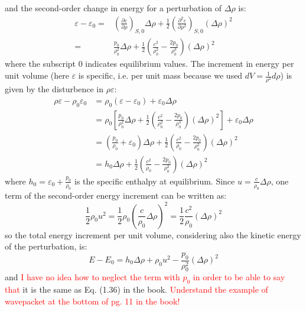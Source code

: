 ﻿\documentclass[11pt]{article}
\begin{document}
\begin{enumerate}
and the second-order change in energy for a perturbation of $\Delta \rho$ is:
  \begin{align}
    \varepsilon - \varepsilon_0 = &\left( \frac{\partial \varepsilon}{\partial \rho} \right)_{S,0} \Delta \rho + \frac{1}{2} \left( \frac{\partial^2 \varepsilon}{\partial \rho^2} \right)_{S,0} (\Delta \rho)^2 \\
    = &\frac{p_0}{\rho_0^2} \Delta \rho + \frac{1}{2} \left( \frac{c^2}{\rho_0^2} - \frac{2p_0}{\rho_0^3} \right) (\Delta \rho)^2
  \end{align}
  where the subscript $0$ indicates equilibrium values.
  The increment in energy per unit volume (here $\varepsilon$ is specific, i.e. per unit mass because we used $dV = \frac{1}{\rho^2} d\rho$) is  given by the disturbence in $\rho \varepsilon$:
  \begin{align}
    \rho \varepsilon - \rho_0 \varepsilon_0 &= \rho_0 \left( \varepsilon - \varepsilon_0 \right) + \varepsilon_0 \Delta \rho \\
    &= \rho_0 \left[ \frac{p_0}{\rho_0^2} \Delta \rho + \frac{1}{2} \left( \frac{c^2}{\rho_0^2} - \frac{2p_0}{\rho_0^3} \right) (\Delta \rho)^2 \right] + \varepsilon_0 \Delta \rho \\
    &= \left( \frac{p_0}{\rho_0} + \varepsilon_0 \right) \Delta \rho + \frac{1}{2} \left( \frac{c^2}{\rho_0} - \frac{2p_0}{\rho_0^2} \right) (\Delta \rho)^2 \\
    &= h_0 \Delta \rho + \frac{1}{2} \left( \frac{c^2}{\rho_0} - \frac{2p_0}{\rho_0^2} \right) (\Delta \rho)^2
  \end{align}
  where $h_0 = \varepsilon_0 + \frac{p_0}{\rho_0}$ is the specific enthalpy at equilibrium.
  Since $u = \frac{c}{\rho_0} \Delta \rho$, one term of the second-order energy increment can be written as:
  \begin{equation}
    \frac{1}{2} \rho_0 u^2 = \frac{1}{2} \rho_0 \left( \frac{c}{\rho_0} \Delta \rho \right)^2 = \frac{1}{2} \frac{c^2}{\rho_0} (\Delta \rho)^2
  \end{equation}
  so the total energy increment per unit volume, considering also the kinetic energy of the perturbation, is:
  \begin{equation}
    E - E_0 = h_0 \Delta \rho + \rho_0 u^2 - \frac{p_0}{\rho_0^2} (\Delta \rho)^2
  \end{equation}
  and \textcolor{red}{I have no idea how to neglect the term with $p_0$ in order to be able to say that} it is the same as Eq. (1.36) in the book.
  \textcolor{red}{Understand the example of wavepacket at the bottom of pg. 11 in the book!}
\end{enumerate}
\end{document}
